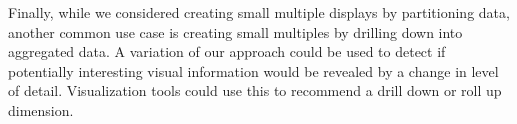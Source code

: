 Finally, while we considered creating small multiple displays by partitioning data, another common use case is creating small multiples by drilling down into aggregated data. A variation of our approach could be used to detect if potentially interesting visual information would be revealed by a change in level of detail. Visualization tools could use this to recommend a drill down or roll up dimension.

